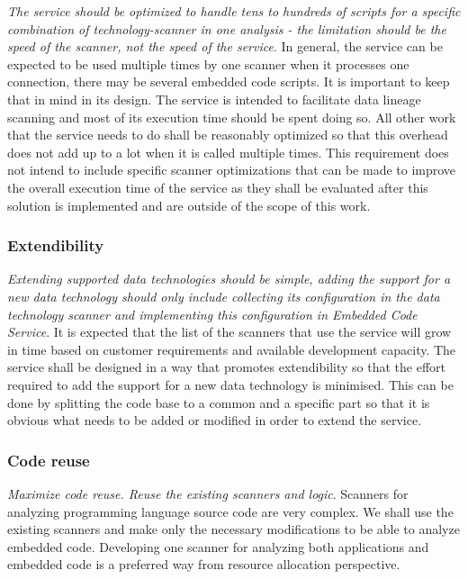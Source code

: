 \textit{The service should be optimized to handle tens to hundreds of scripts for a specific combination of technology-scanner in one analysis - the limitation should be the speed of the scanner, not the speed of the service}. In general, the service can be expected to be used multiple times by one scanner when it processes one connection, there may be several embedded code scripts. It is important to keep that in mind in its design. The service is intended to facilitate data lineage scanning and most of its execution time should be spent doing so. All other work that the service needs to do shall be reasonably optimized so that this overhead does not add up to a lot when it is called multiple times. This requirement does not intend to include specific scanner optimizations that can be made to improve the overall execution time of the service as they shall be evaluated after this solution is implemented and are outside of the scope of this work.

\subsubsection{Extendibility}

\textit{Extending supported data technologies should be simple, adding the support for a new data technology should only include collecting its configuration in the data technology scanner and implementing this configuration in Embedded Code Service}. It is expected that the list of the scanners that use the service will grow in time based on customer requirements and available development capacity. The service shall be designed in a way that promotes extendibility so that the effort required to add the support for a new data technology is minimised. This can be done by splitting the code base to a common and a specific part so that it is obvious what needs to be added or modified in order to extend the service.

\subsubsection{Code reuse}

\textit{Maximize code reuse. Reuse the existing scanners and logic}. Scanners for analyzing programming language source code are very complex. We shall use the existing scanners and make only the necessary modifications to be able to analyze embedded code. Developing one scanner for analyzing both applications and embedded code is a preferred way from resource allocation perspective.

